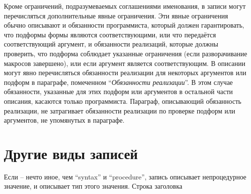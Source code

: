 Кроме ограничений, подразумеваемых соглашениями именования, в записи могут перечисляться
дополнительные явные ограничения. Эти явные ограничения обычно описывают и обязанности
программиста, который должен гарантировать, что подформы формы являются соответствующими, или
что передаётся соответствующий аргумент, и обязанности реализаций, которые должны проверить, что
подформа соблюдает указанные ограничения (если разворачивание макросов завершено), или если
аргумент является соответствующим. В описании могут явно перечисляться обязанности реализации
для некоторых аргументов или подформ в параграфе, помеченном ``\textit {Обязанности
  реализации}''. В этом случае обязанности, указанные для этих подформ или аргументов в
остальной части описания, касаются только программиста. Параграф, описывающий обязанность
реализации, не затрагивает обязанности реализации по проверке подформ или аргументов, не
упомянутых в параграфе.\vspace{1.6mm}

\section{Другие виды записей}\vspace{1.6mm}

Если  -- нечто иное, чем ``syntax'' и ``procedure'', запись описывает
непроцедурное значение, и  описывает тип этого значения. Строка
заголовка\vspace{1.6mm}


